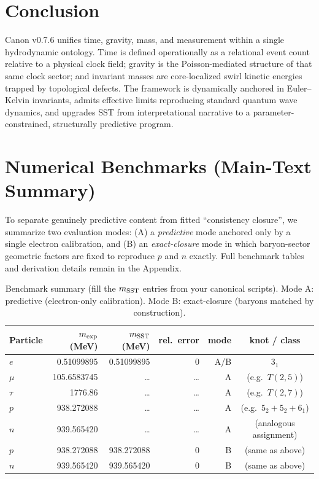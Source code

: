 \documentclass[10pt]{article}
\begin{document}
    \section{Conclusion}
    \label{sec:conclusion}

    Canon v0.7.6 unifies time, gravity, mass, and measurement within a single
    hydrodynamic ontology. Time is defined operationally as a relational event count
    relative to a physical clock field; gravity is the Poisson-mediated structure of
    that same clock sector; and invariant masses are core-localized swirl kinetic
    energies trapped by topological defects. The framework is dynamically anchored
    in Euler--Kelvin invariants, admits effective limits reproducing standard quantum
    wave dynamics, and upgrades SST from interpretational narrative to a
    parameter-constrained, structurally predictive program.


\section{Numerical Benchmarks (Main-Text Summary)}
\label{sec:v075-benchmarks}

To separate genuinely predictive content from fitted ``consistency closure'',
we summarize two evaluation modes:
(A) a \emph{predictive} mode anchored only by a single electron calibration,
and (B) an \emph{exact-closure} mode in which baryon-sector geometric factors
are fixed to reproduce $p$ and $n$ exactly. Full benchmark tables and derivation
details remain in the Appendix.

\begin{table}[h]
\centering
\caption{Benchmark summary (fill the $m_{\rm SST}$ entries from your canonical scripts). Mode A: predictive (electron-only calibration). Mode B: exact-closure (baryons matched by construction).}
\begin{tabular}{lrrrrc}
\hline
Particle & $m_{\rm exp}$ (MeV) & $m_{\rm SST}$ (MeV) & rel.\ error & mode & knot / class \\
\hline
$e$   & 0.51099895 & 0.51099895 & 0 & A/B & $3_1$ \\
$\mu$ & 105.6583745 & \dots & \dots & A & (e.g.\ $T(2,5)$) \\
$\tau$& 1776.86     & \dots & \dots & A & (e.g.\ $T(2,7)$) \\
$p$   & 938.272088  & \dots & \dots & A & (e.g.\ $5_2+5_2+6_1$) \\
$n$   & 939.565420  & \dots & \dots & A & (analogous assignment) \\
\hline
$p$   & 938.272088  & 938.272088 & 0 & B & (same as above) \\
$n$   & 939.565420  & 939.565420 & 0 & B & (same as above) \\
\hline
\end{tabular}
\end{table}
\end{document}
